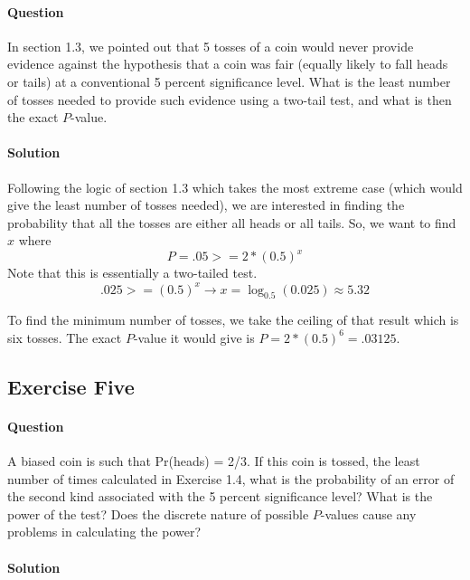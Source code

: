 \documentclass[]{article}
\let\oldparagraph\paragraph
\renewcommand{\paragraph}[1]{\oldparagraph{#1}\mbox{}}
\begin{document}
\paragraph{Question}\label{question-3}

In section 1.3, we pointed out that 5 tosses of a coin would never
provide evidence against the hypothesis that a coin was fair (equally
likely to fall heads or tails) at a conventional 5 percent significance
level. What is the least number of tosses needed to provide such
evidence using a two-tail test, and what is then the exact \(P\)-value.

\paragraph{Solution}\label{solution-3}

Following the logic of section 1.3 which takes the most extreme case
(which would give the least number of tosses needed), we are interested
in finding the probability that all the tosses are either all heads or
all tails. So, we want to find \(x\) where \[
        P =     .05 >= 2 * (0.5)^x
    \] Note that this is essentially a two-tailed test. \[
        .025 >= (0.5)^x \rightarrow x = \log_{0.5}(0.025) \approx 5.32
    \]

To find the minimum number of tosses, we take the ceiling of that result
which is six tosses. The exact \(P\)-value it would give is
\(P = 2 * (0.5)^6 = .03125\).

\pagebreak

\subsection{Exercise Five}\label{exercise-five}

\paragraph{Question}\label{question-4}

A biased coin is such that Pr(heads) = 2/3. If this coin is tossed, the
least number of times calculated in Exercise 1.4, what is the
probability of an error of the second kind associated with the 5 percent
significance level? What is the power of the test? Does the discrete
nature of possible \(P\)-values cause any problems in calculating the
power?

\paragraph{Solution}\label{solution-4}
\end{document}
